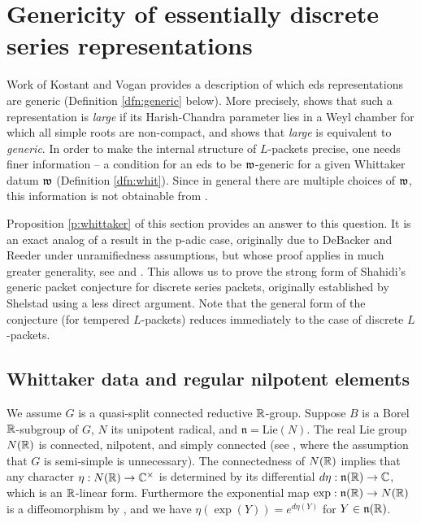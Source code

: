 \documentclass{article}
\theoremstyle{definition}
\numberwithin{equation}{section}
\renewcommand{\-}{\hyp{}}
\newcommand{\n}{\mathfrak n}
\begin{document}
\section{Genericity of essentially discrete series representations} \label{sec:gen}

Work of Kostant \cite{Kos78} and Vogan \cite{Vog78} provides a description of which eds representations are generic (Definition \ref{dfn:generic} below). More precisely, \cite[Theorem 6.2(a,f)]{Vog78} shows that such a representation is \emph{large} if its Harish-Chandra parameter lies in a Weyl chamber for which all simple roots are non-compact, and \cite[Theorem L]{Kos78} shows that \emph{large} is equivalent to \emph{generic}. In order to make the internal structure of $L$-packets precise, one needs finer information -- a condition for an eds to be $\mathfrak{w}$-generic for a given Whittaker datum $\mathfrak{w}$ (Definition \ref{dfn:whit}). Since in general there are multiple choices of $\mathfrak{w}$, this information is not obtainable from \cite[Theorem 6.2(a,f)]{Vog78}.
 
Proposition \ref{p:whittaker} of this section provides an answer to this question. It is an exact analog of a result in the p-adic case, originally due to DeBacker and Reeder \cite[Proposition 4.10]{DR10} under unramifiedness assumptions, but whose proof applies in much greater generality, see \cite[Lemma 6.2.2]{KalRSP} and \cite[\S4.4]{FKS}. This allows us to prove the strong form of Shahidi's generic packet conjecture \cite[\S9]{Sha90} for discrete series packets, originally established by Shelstad \cite{SheTE3} using a less direct argument. Note that the general form of the conjecture (for tempered $L$\-packets) reduces immediately to the case of discrete $L$\-packets.

\subsection{Whittaker data and regular nilpotent elements} \label{sub:whit}

We assume  $G$ is a quasi-split connected reductive
$\mathbb{R}$-group. Suppose $B$ is a Borel $\mathbb{R}$-subgroup of $G$, $N$ its
unipotent radical, and $\n=\mathrm{Lie}(N)$.
The real Lie group $N(\mathbb{R})$ is connected, nilpotent,
and simply connected (see \cite[Theorem 6.46]{KnappLie}, where the assumption that $G$ is semi-simple is unnecessary). The connectedness of $N(\mathbb{R})$ implies that any character $\eta : N(\mathbb{R}) \to \mathbb{C}^\times$ is determined by its differential $d\eta : \n(\R) \to \C$, which is an $\mathbb{R}$-linear form. Furthermore the exponential map $\exp : \n(\R) \to N(\R)$ is a diffeomorphism by \cite[Theorem 1.127]{KnappLie}, and we have $\eta(\exp(Y))=e^{d\eta (Y)}$ for $Y \in \n(\R)$. 
\end{document}
